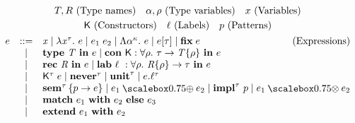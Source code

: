 \begin{gather*}
  T,R~\text{(Type names)}\quad \alpha,\rho~\text{(Type variables)} \quad x~\text{(Variables)}  \\
  \fnlab{K}~\text{(Constructors)} \quad \ell~\text{(Labels)} \quad p~\text{(Patterns)} \\
  \begin{array}{lcl}
    e &::=& \tmvar{x} \mid \tmlam{x}{\tau}{e} \mid \tmapp{e_1}{e_2} \mid \tmtylam{\alpha}{\kappa}{e} \mid \tmtyapp{e}{\tau} \mid \tmfix{e} \qquad\hfill\text{(Expressions)}\\
           & \mid & \tmtype{T}{e} \mid \tmcondef{K}{\rho}{\tau}{T}{e} \\
           & \mid & \tmrec{R}{e} \mid \tmlabdef{\ell}{\rho}{R}{\tau}{e} \\
           & \mid & \tmconapp{K}{\tau}{e} \mid \tmnever{\tau} \mid \tmunit{\tau} \mid \tmlabproj{e}{\ell}{\tau} \\
           & \mid & \tmsem{\tau}{p}{e} \mid \tmcomp{e_1}{e_2} \mid \tmimpl{\tau}{p} \mid \tmpcomp{e_1}{e_2} \\
           & \mid & \tmmatch{e_1}{e_2}{e_3} \\
           & \mid & \tmext{e_1}{e_2} \\[1mm]
  \end{array}
\end{gather*}
